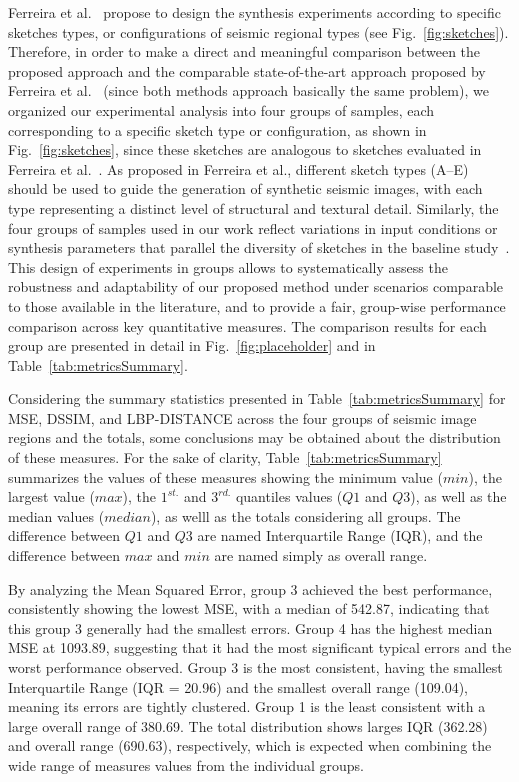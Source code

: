 \documentclass{ieeeaccess}
\begin{document}
Ferreira et al.~\cite{Ferreira2020} propose to design the synthesis experiments according to specific sketches types, or configurations of seismic regional types (see Fig.~\ref{fig:sketches}). Therefore, in order to make a direct and meaningful comparison between the proposed approach and the comparable state-of-the-art approach proposed by Ferreira et al.~\cite{Ferreira2020} (since both methods approach basically the same problem), we organized our experimental analysis into four groups of samples, each corresponding to a specific sketch type or configuration, as shown in Fig.~\ref{fig:sketches}, since these sketches are analogous to sketches evaluated in Ferreira et al.~\cite{Ferreira2020}. As proposed in Ferreira et al., different sketch types (A--E) should be used to guide the generation of synthetic seismic images, with each type representing a distinct level of structural and textural detail. Similarly, the four groups of samples used in our work reflect variations in input conditions or synthesis parameters that parallel the diversity of sketches in the baseline study~\cite{Ferreira2020}. This design of experiments in groups allows to systematically assess the robustness and adaptability of our proposed method under scenarios comparable to those available in the literature, and to provide a fair, group-wise performance comparison across key quantitative measures. The comparison results for each group are presented in detail in Fig.~\ref{fig:placeholder} and in Table~\ref{tab:metricsSummary}.

Considering the summary statistics presented in Table~\ref{tab:metricsSummary} for MSE, DSSIM, and LBP-DISTANCE across the four groups of seismic image regions and the totals, some conclusions may be obtained about the distribution of these measures. For the sake of clarity, Table~\ref{tab:metricsSummary} summarizes the values of these measures showing the minimum value ($min$), the largest value ($max$), the $1^{st.}$ and $3^{rd.}$ quantiles values ($Q1$ and $Q3$), as well as the median values ($median$), as welll as the totals considering all groups. The difference between $Q1$ and $Q3$ are named  Interquartile Range (IQR), and the difference between $max$ and $min$ are named simply as overall range.  

By analyzing the Mean Squared Error, group 3 achieved the best performance, consistently showing the lowest MSE, with a median of 542.87, indicating that this group 3 generally had the smallest errors. Group 4 has the highest median MSE at 1093.89, suggesting that it had the most significant typical errors and the worst performance observed. Group 3 is the most consistent, having the smallest Interquartile Range (IQR = 20.96) and the smallest overall range (109.04), meaning its errors are tightly clustered. Group 1 is the least consistent with a large overall range of 380.69. The total distribution shows larges IQR (362.28) and overall range (690.63), respectively, which is expected when combining the wide range of measures values from the individual groups.
\end{document}
